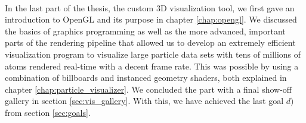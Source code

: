 \\
In the last part of the thesis, the custom 3D visualization tool, we first gave an introduction to OpenGL and its purpose in chapter \ref{chap:opengl}. We discussed the basics of graphics programming as well as the more advanced, important parts of the rendering pipeline that allowed us to develop an extremely efficient visualization program to visualize large particle data sets with tens of millions of atoms rendered real-time with a decent frame rate. This was possible by using a combination of billboards and instanced geometry shaders, both explained in chapter \ref{chap:particle_visualizer}. We concluded the part with a final show-off gallery in section \ref{sec:vis_gallery}. With this, we have achieved the last goal $d)$ from section \ref{sec:goals}. 
